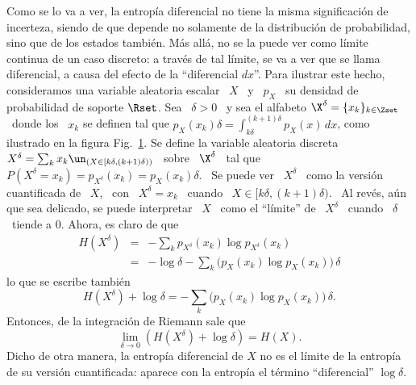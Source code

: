 Como se lo va a ver, la entrop\'ia diferencial no tiene la misma significaci\'on
de  incerteza,  siendo de  que  depende no  solamente  de  la distribuci\'on  de
probabilidad, sino que  de los estados tambi\'en.  M\'as all\'a,  no se la puede
ver como l\'imite  continua de un caso discreto: a trav\'es  de tal l\'imite, se
va  a ver  que se  llama diferencial,  a causa  del efecto  de  la ``diferencial
$dx$''.  Para ilustrar este hecho, consideramos una variable aleatoria escalar \
$X$ \ y \ $p_X$ \ su densidad de probabilidad de soporte $\Rset$.  Sea \ $\delta
> 0$  \ y sea el alfabeto  $\X^\delta = \{ x_k  \}_{k \in \Zset}$ \  donde los \
$x_k$ se definen tal que $\displaystyle p_X(x_k) \delta = \int_{k \delta}^{(k+1)
  \delta}     p_X(x)    \,     dx$,    como     ilustrado    en     la    figura
Fig.~\ref{Fig:SZ:CuantificacionX}.  Se  define la variable  aleatoria discreta \
$X^\delta =  \sum_k x_k  \un_{(X \in  [k \delta ,  (k+1) \delta  ))}$ \  sobre \
$\X^\delta$  \ tal  que  \ $P(X^\delta  =  x_k) =  p_{X^\delta}(x_k) =  p_X(x_k)
\delta$.  \ Se puede ver \ $X^\delta$ \ como la versi\'on cuantificada de \ $X$,
\ con \  $X^\delta = x_k$ \ cuando \  $X \in [k \delta , (k+1)  \delta )$.  \ Al
rev\'es,  a\'un  que  sea  delicado,  se  puede interpretar  \  $X$  \  como  el
``l\'imite'' de \ $X^\delta$  \ cuando \ $\delta$ \ tiende a  0. Ahora, es claro
de que
%
\begin{eqnarray*}
H(X^\delta) & = & - \sum_k p_{X^\delta}(x_k) \log p_{X^\delta}(x_k)\\[2.5mm]
%
& = & - \log \delta - \sum_k \Big( p_X(x_k) \log p_X(x_k) \Big) \, \delta
\end{eqnarray*}
%
lo que se escribe tambi\'en
%
\[
H(X^\delta)  + \log  \delta =  - \sum_k  \Big( p_X(x_k)  \log p_X(x_k)  \Big) \,
\delta.
\]
%
Entonces, de la integraci\'on de Riemann sale que
%
\[
\lim_{\delta \to 0} \left( H(X^\delta) + \log \delta \right) = H(X).
\]
%
Dicho de otra manera,  la entrop\'ia diferencial de $X$ no es  el l\'imite de la
entrop\'ia de su versi\'on cuantificada:  aparece con la entrop\'ia el t\'ermino
``diferencial'' $\log \delta$.
%
\begin{figure}[h!]
%
\begin{center}  \end{center}
%
%
\label{Fig:SZ:CuantificacionX}
\end{figure}
%

